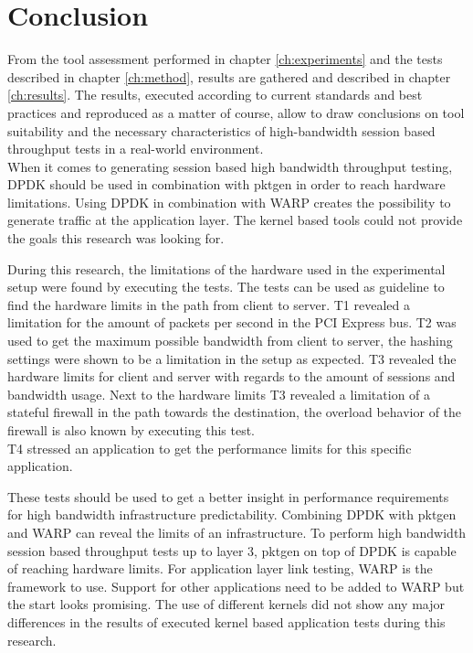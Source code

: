 \chapter{Conclusion}\label{ch:conclusion}
From the tool assessment performed in chapter \ref{ch:experiments} and the tests described in chapter \ref{ch:method}, results are gathered and described in chapter \ref{ch:results}.
The results, executed according to current standards and best practices and reproduced as a matter of course, allow to draw conclusions on tool suitability and the necessary characteristics of high-bandwidth session based throughput tests in a real-world environment. \\
When it comes to generating session based high bandwidth throughput testing, DPDK should be used in combination with pktgen in order to reach hardware limitations. 
Using DPDK in combination with WARP creates the possibility to generate traffic at the application layer. 
The kernel based tools could not provide the goals this research was looking for. 

During this research, the limitations of the hardware used in the experimental setup were found by executing the tests. 
The tests can be used as guideline to find the hardware limits in the path from client to server. 
T1 revealed  a limitation for the amount of packets per second in the PCI Express bus. 
T2 was used to get the maximum possible bandwidth from client to server, the hashing settings were shown to be a limitation in the setup as expected.
T3 revealed the hardware limits for client and server with regards to the amount of sessions and bandwidth usage.
Next to the hardware  limits T3 revealed a limitation of a stateful firewall in the path towards the destination, the overload behavior of the firewall is also known by executing this test.\\ 
T4 stressed an application to get the performance limits for this specific application.
 
These tests should be used to get a better insight in performance requirements for high bandwidth infrastructure predictability.
Combining DPDK with pktgen and WARP can reveal the limits of an infrastructure.
To perform high bandwidth session based throughput tests up to layer 3, pktgen on top of DPDK is capable of reaching hardware limits.
For application layer link testing, WARP is the framework to use. Support for other applications need to be added to WARP but the start looks promising.
The use of different kernels did not show any major differences in the results of executed kernel based application tests during this research. 

